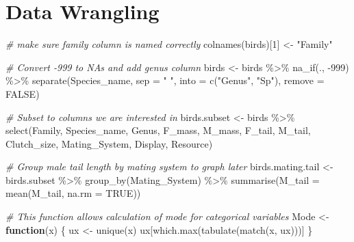 \documentclass[
  12pt,
]{article}
\newenvironment{Shaded}{\begin{snugshade}}{\end{snugshade}}
\newcommand{\AttributeTok}[1]{\textcolor[rgb]{0.77,0.63,0.00}{#1}}
\newcommand{\CommentTok}[1]{\textcolor[rgb]{0.56,0.35,0.01}{\textit{#1}}}
\newcommand{\ConstantTok}[1]{\textcolor[rgb]{0.00,0.00,0.00}{#1}}
\newcommand{\ControlFlowTok}[1]{\textcolor[rgb]{0.13,0.29,0.53}{\textbf{#1}}}
\newcommand{\DecValTok}[1]{\textcolor[rgb]{0.00,0.00,0.81}{#1}}
\newcommand{\FunctionTok}[1]{\textcolor[rgb]{0.00,0.00,0.00}{#1}}
\newcommand{\NormalTok}[1]{#1}
\newcommand{\OtherTok}[1]{\textcolor[rgb]{0.56,0.35,0.01}{#1}}
\newcommand{\SpecialCharTok}[1]{\textcolor[rgb]{0.00,0.00,0.00}{#1}}
\newcommand{\StringTok}[1]{\textcolor[rgb]{0.31,0.60,0.02}{#1}}
\begin{document}
\newpage

\hypertarget{data-wrangling}{%
\section{Data Wrangling}\label{data-wrangling}}

\begin{Shaded}
\begin{Highlighting}[]
\CommentTok{\# make sure family column is named correctly}
\FunctionTok{colnames}\NormalTok{(birds)[}\DecValTok{1}\NormalTok{] }\OtherTok{\textless{}{-}} \StringTok{"Family"}

\CommentTok{\# Convert {-}999 to NAs and add genus column}
\NormalTok{birds }\OtherTok{\textless{}{-}}\NormalTok{ birds }\SpecialCharTok{\%\textgreater{}\%}
  \FunctionTok{na\_if}\NormalTok{(., }\SpecialCharTok{{-}}\DecValTok{999}\NormalTok{) }\SpecialCharTok{\%\textgreater{}\%}
  \FunctionTok{separate}\NormalTok{(Species\_name, }
           \AttributeTok{sep =} \StringTok{" "}\NormalTok{, }
           \AttributeTok{into =} \FunctionTok{c}\NormalTok{(}\StringTok{"Genus"}\NormalTok{, }\StringTok{"Sp"}\NormalTok{), }
           \AttributeTok{remove =} \ConstantTok{FALSE}\NormalTok{)}

\CommentTok{\# Subset to columns we are interested in}
\NormalTok{birds.subset }\OtherTok{\textless{}{-}}\NormalTok{ birds }\SpecialCharTok{\%\textgreater{}\%}
  \FunctionTok{select}\NormalTok{(Family, Species\_name, Genus, F\_mass, M\_mass, }
\NormalTok{         F\_tail, M\_tail, Clutch\_size, Mating\_System, }
\NormalTok{         Display, Resource)}

\CommentTok{\# Group male tail length by mating system to graph later}
\NormalTok{birds.mating.tail }\OtherTok{\textless{}{-}}\NormalTok{ birds.subset }\SpecialCharTok{\%\textgreater{}\%}
  \FunctionTok{group\_by}\NormalTok{(Mating\_System) }\SpecialCharTok{\%\textgreater{}\%}
  \FunctionTok{summarise}\NormalTok{(}\AttributeTok{M\_tail =} \FunctionTok{mean}\NormalTok{(M\_tail, }\AttributeTok{na.rm =} \ConstantTok{TRUE}\NormalTok{))}

\CommentTok{\# This function allows calculation of mode for categorical variables}
\NormalTok{Mode }\OtherTok{\textless{}{-}} \ControlFlowTok{function}\NormalTok{(x) \{}
\NormalTok{  ux }\OtherTok{\textless{}{-}} \FunctionTok{unique}\NormalTok{(x) }
\NormalTok{  ux[}\FunctionTok{which.max}\NormalTok{(}\FunctionTok{tabulate}\NormalTok{(}\FunctionTok{match}\NormalTok{(x, ux)))]}
\NormalTok{\}}


\end{Highlighting}
\end{Shaded}
\end{document}
